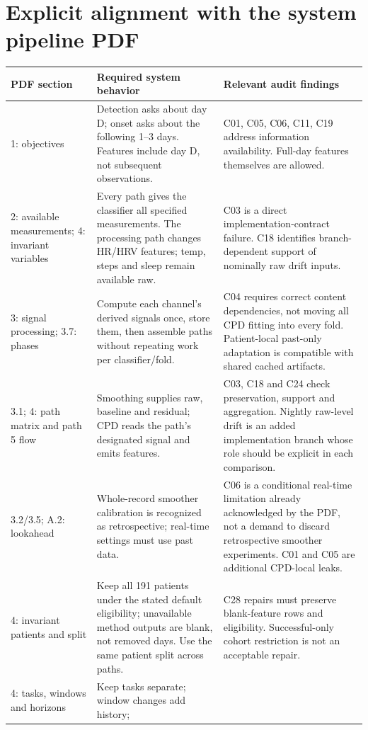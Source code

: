 \documentclass[11pt,a4paper]{article}
\begin{document}
\section{Explicit alignment with the system pipeline PDF}
\begin{longtable}{@{}p{}p{}p{}@{}}
\toprule PDF section & Required system behavior & Relevant audit findings \\
\midrule\endhead
1: objectives & Detection asks about day D; onset asks about the following
1--3 days. Features include day D, not subsequent observations. & C01, C05, C06,
C11, C19 address information availability. Full-day features themselves are allowed. \\
2: available measurements; 4: invariant variables & Every path gives the classifier
all specified measurements. The processing path changes HR/HRV features; temp,
steps and sleep remain available raw. & C03 is a direct implementation-contract
failure. C18 identifies branch-dependent support of nominally raw drift inputs. \\
3: signal processing; 3.7: phases & Compute each channel's derived signals once,
store them, then assemble paths without repeating work per classifier/fold. & C04
requires correct content dependencies, not moving all CPD fitting into every fold.
Patient-local past-only adaptation is compatible with shared cached artifacts. \\
3.1; 4: path matrix and path 5 flow & Smoothing supplies raw, baseline and residual;
CPD reads the path's designated signal and emits features. & C03, C18 and C24
check preservation, support and aggregation. Nightly raw-level drift is an added
implementation branch whose role should be explicit in each comparison. \\
3.2/3.5; A.2: lookahead & Whole-record smoother calibration is recognized as
retrospective; real-time settings must use past data. & C06 is a conditional
real-time limitation already acknowledged by the PDF, not a demand to discard
retrospective smoother experiments. C01 and C05 are additional CPD-local leaks. \\
4: invariant patients and split & Keep all 191 patients under the stated default
eligibility; unavailable method outputs are blank, not removed days. Use the same
patient split across paths. & C28 repairs must preserve blank-feature rows and
eligibility. Successful-only cohort restriction is not an acceptable repair. \\
4: tasks, windows and horizons & Keep tasks separate; window changes add history;

\end{longtable}
\end{document}
